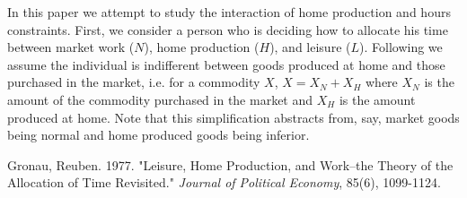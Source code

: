 \documentclass{article}
\begin{document}
In this paper we attempt to study the interaction of home production and hours constraints.  First, we consider a person who is deciding how to allocate his time between market work ($N$), home production ($H$), and leisure ($L$). Following 
\cite{gronau77} 
we assume the individual is indifferent between goods produced at home and those purchased in the market, i.e. for a commodity $X$, $X=X_{N}+X_{H}$ where $X_{N}$ is the amount of the commodity purchased in the market and $X_{H}$ is the amount produced at home. Note that this simplification abstracts from, say, market goods being normal and home produced goods being inferior.

\begin{thebibliography}{9}

	Gronau, Reuben. 
	1977. 
	"Leisure, Home Production, and Work--the Theory of the Allocation of Time Revisited." 
	\emph{Journal of Political Economy},
	85(6), 1099-1124.

\end{thebibliography}
\end{document}
